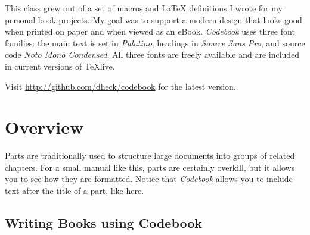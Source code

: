 \documentclass[minted]{codebook}
\begin{document}
This class grew out of a set of macros and \LaTeX{} definitions I wrote for my personal book projects.
My goal was to support a modern design that looks good when printed on paper and when viewed as an eBook.
\emph{Codebook} uses three font families: the main text is set in \emph{Palatino}, headings in \emph{Source Sans Pro}, and source code \emph{Noto Mono Condensed}.
All three fonts are freely available and are included in current versions of \TeX{}live.

Visit \url{http://github.com/dheck/codebook} for the latest version.


\mainmatter

\part{Overview}

Parts are traditionally used to structure large documents into groups of related chapters.
For a small manual like this, parts are certainly overkill, but it allows you to see how they are formatted.
Notice that \emph{Codebook} allows you to include text after the title of a part, like here.


\chapter{Writing Books using Codebook}

\end{document}
